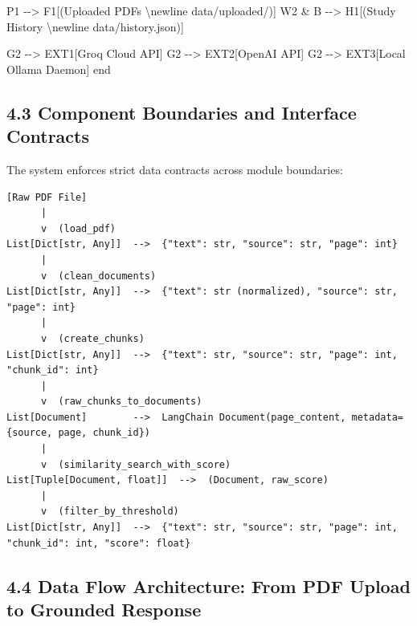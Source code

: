 \documentclass[
]{article}
\newenvironment{Shaded}{}{}
\newcommand{\NormalTok}[1]{#1}
\begin{document}
\begin{Shaded}
\begin{Highlighting}[]
\NormalTok{        P1 {-}{-}\textgreater{} F1[(Uploaded PDFs \textbackslash{}newline data/uploaded/)]}
\NormalTok{        W2 \& B {-}{-}\textgreater{} H1[(Study History \textbackslash{}newline data/history.json)]}
        
\NormalTok{        G2 {-}{-}\textgreater{} EXT1[Groq Cloud API]}
\NormalTok{        G2 {-}{-}\textgreater{} EXT2[OpenAI API]}
\NormalTok{        G2 {-}{-}\textgreater{} EXT3[Local Ollama Daemon]}
\NormalTok{    end}
\end{Highlighting}
\end{Shaded}

\subsection{4.3 Component Boundaries and Interface
Contracts}\label{component-boundaries-and-interface-contracts}

The system enforces strict data contracts across module boundaries:

\begin{verbatim}
[Raw PDF File]
      |
      v  (load_pdf)
List[Dict[str, Any]]  -->  {"text": str, "source": str, "page": int}
      |
      v  (clean_documents)
List[Dict[str, Any]]  -->  {"text": str (normalized), "source": str, "page": int}
      |
      v  (create_chunks)
List[Dict[str, Any]]  -->  {"text": str, "source": str, "page": int, "chunk_id": int}
      |
      v  (raw_chunks_to_documents)
List[Document]        -->  LangChain Document(page_content, metadata={source, page, chunk_id})
      |
      v  (similarity_search_with_score)
List[Tuple[Document, float]]  -->  (Document, raw_score)
      |
      v  (filter_by_threshold)
List[Dict[str, Any]]  -->  {"text": str, "source": str, "page": int, "chunk_id": int, "score": float}
\end{verbatim}

\subsection{4.4 Data Flow Architecture: From PDF Upload to Grounded
Response}\label{data-flow-architecture-from-pdf-upload-to-grounded-response}
\end{document}
